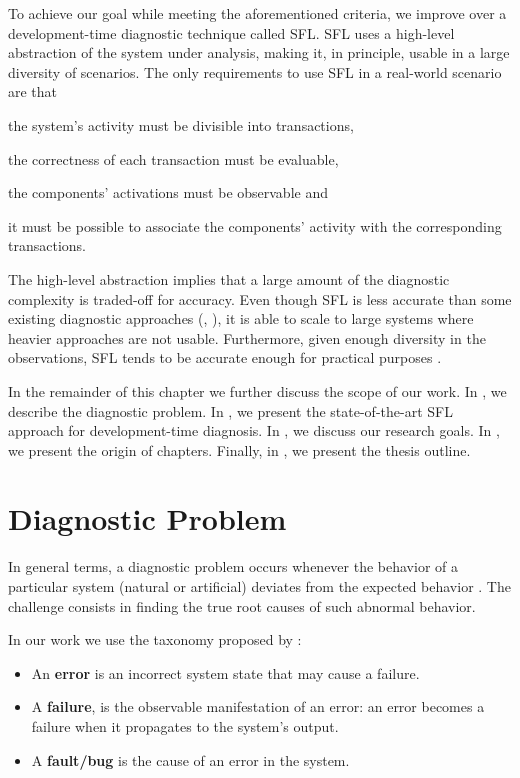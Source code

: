 To achieve our goal while meeting the aforementioned criteria, we
improve over a development-time diagnostic technique called \ac{SFL}.
%
\ac{SFL} uses a high-level abstraction of the system under analysis,
making it, in principle, usable in a large diversity of scenarios.
%
The only requirements to use \ac{SFL} in a real-world scenario are
that
\begin{inparaenum}[(1)]
\item the system's activity must be divisible into transactions,
\item the correctness of each transaction must be evaluable,
\item the components' activations must be observable and
\item it must be possible to associate the components' activity with
  the corresponding transactions.
\end{inparaenum}

The high-level abstraction implies that a large amount of the
diagnostic complexity is traded-off for accuracy.
%
Even though \ac{SFL} is less accurate than some existing diagnostic
approaches (\eg, \cite{Reiter87,Kleer87,Mayer03,Wotawa02}), it is able to
scale to large systems where heavier approaches are not usable.
%
Furthermore, given enough diversity in the observations, \ac{SFL}
tends to be accurate enough for practical
purposes \cite{Santelices09,Abreu09f}.


In the remainder of this chapter we further discuss the scope of our
work.
%
In , we describe the
diagnostic problem.
%
In , we present the state-of-the-art
\ac{SFL} approach for development-time diagnosis.
%
In , we discuss our research
goals.
%
In , we present the origin of
chapters.
%
Finally, in , we present the thesis
outline.

\section{Diagnostic Problem}
\label{sec:intro:diagnostic-problem}
In general terms, a diagnostic problem occurs whenever the behavior of
a particular system (natural or artificial) deviates from the expected
behavior \cite{Reiter87,Kleer92}.
%
The challenge consists in finding the true root causes of such
abnormal behavior.
%

In our work we use the taxonomy proposed by \cite{Avizienis04}:
\begin{itemize}
\item An \textbf{error} is an incorrect system state that may cause a
  failure.
\item A \textbf{failure}, is the observable manifestation of an error:
  an error becomes a failure when it propagates to the system's output.
\item A \textbf{fault/bug} is the cause of an error in the system.
\end{itemize}

